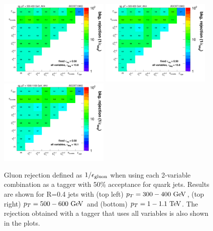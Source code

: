 \begin{figure}
\centering
\includegraphics[width=0.48\textwidth]{./Figures/QGTagging/pT300/AKtR04/effBkg2D.png}
\includegraphics[width=0.48\textwidth]{./Figures/QGTagging/pT500/AKtR04/effBkg2D.png}
\includegraphics[width=0.48\textwidth]{./Figures/QGTagging/pT1000/AKtR04/effBkg2D.png}
\caption{Gluon rejection defined as $1/\epsilon_{\rm gluon}$ when using each 2-variable combination 
as a tagger with 50\% acceptance for quark jets. Results are shown for R=0.4 jets with (top left) $\pt=300-400 \GeV$, 
(top right) $\pt=500-600 \GeV$ and (bottom) $\pt=1-1.1 \TeV$. The rejection obtained with a tagger that uses all variables is also shown
in the plots. }
\label{fig:qg_akt4_comb}
\end{figure}
